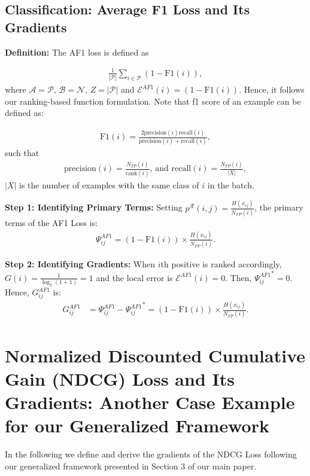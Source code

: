 \documentclass{article}
\begin{document}
{\subsection{Classification: Average F1 Loss and Its Gradients}
\textbf{Definition:} The AF1 loss is defined as 

\begin{align}
\frac{1}{|\mathcal{P}|} \sum \limits_{i \in \mathcal{P}} (1-\mathrm{F1}(i)), 
\end{align}
where $\mathcal{A}=\mathcal{P}$, $\mathcal{B}=\mathcal{N}$, $Z=|\mathcal{P}|$ and $\mathcal{E}^{AF1} (i) = (1-\mathrm{F1}(i))$. Hence, it follows our ranking-based function formulation. Note that f1 score of an example can be defined as:

\begin{align}
    \mathrm{F1}(i) = \frac{2 \mathrm{precision}(i) \mathrm{recall}(i)}{\mathrm{precision}(i) + \mathrm{recall}(i)},
\end{align}
such that
\begin{align}
    \mathrm{precision}(i) = \frac{N_{TP}(i) }{\mathrm{rank}(i)} \text{, and } \mathrm{recall}(i) = \frac{N_{TP}(i) }{|X|},
\end{align}
$|X|$ is the number of examples with the same class of $i$ in the batch.

\textbf{Step 1: Identifying Primary Terms:} Setting $p^{\mathcal{R}}(i, j) = \frac{H(x_{ij})}{N_{FP}(i)}$, the primary terms of the AF1 Loss is:
\begin{align}
    \label{eq:AF1GeneralPrimaryTermDefinition}
    \Psi^{AF1}_{ij} = (1-\mathrm{F1}(i)) \times \frac{H(x_{ij})}{N_{FP}(i)}.
\end{align}

\textbf{Step 2: Identifying Gradients:} When $i$th positive is ranked accordingly, $G(i) = \frac{1}{\log_2(1+1)}=1$ and the local error is $\mathcal{E}^{AF1} (i) =0 $. Then, ${\Psi^{AF1}_{ij}}^* =0$. Hence, $G_{ij} ^{AF1}$ is:
\begin{align}
    \label{eq:AF1ClassificationGrads}
    G_{ij} ^{AF1} &= \Psi^{AF1}_{ij} - {\Psi^{AF1}_{ij}}^* 
    = (1-\mathrm{F1}(i)) \times \frac{H(x_{ij})}{N_{FP}(i)}.
\end{align}
}

\section{Normalized Discounted Cumulative Gain (NDCG) Loss and Its Gradients: Another Case Example for our Generalized Framework}
In the following we define and derive the gradients of the NDCG Loss \cite{OptimizingUpperBound} following our generalized framework presented in Section 3 of our main paper.
\end{document}
